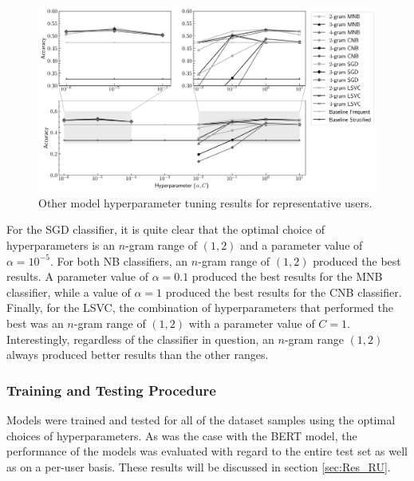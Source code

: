 \begin{figure}[ht]
    \hspace*{-0.3in}
    \includegraphics[scale=0.55]{figures/05_impl/02_pu/plot_hyperparams_base.png}
    \caption{Other model hyperparameter tuning results for representative users.}
    \label{fig:DI_PU_BaseHP}
\end{figure}

For the SGD classifier, it is quite clear that the optimal choice of hyperparameters is an $n$-gram range of $(1, 2)$ and a parameter value of $\alpha=10^{-5}$. For both NB classifiers, an $n$-gram range of $(1, 2)$ produced the best results. A parameter value of $\alpha=0.1$ produced the best results for the MNB classifier, while a value of $\alpha=1$ produced the best results for the CNB classifier. Finally, for the LSVC, the combination of hyperparameters that performed the best was an $n$-gram range of $(1, 2)$ with a parameter value of $C=1$. Interestingly, regardless of the classifier in question, an $n$-gram range $(1, 2)$ always produced better results than the other ranges.

\subsubsection{Training and Testing Procedure}

Models were trained and tested for all of the dataset samples using the optimal choices of hyperparameters. As was the case with the BERT model, the performance of the models was evaluated with regard to the entire test set as well as on a per-user basis. These results will be discussed in section \ref{sec:Res_RU}.
